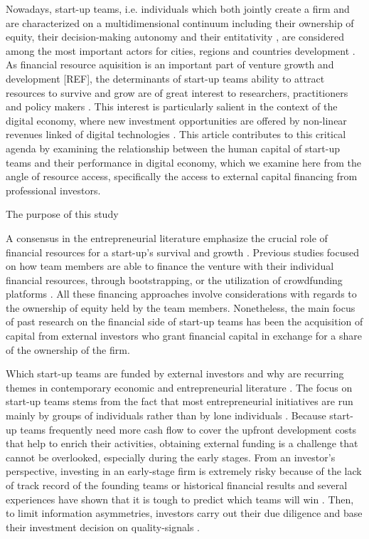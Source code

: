 \documentclass[12pt]{article}
\begin{document}
Nowadays, start-up teams, i.e. individuals which both jointly create a firm and are characterized on a multidimensional continuum including their ownership of equity, their decision-making autonomy and their entitativity \citep{kamm1990entrepreneurial, knight2020start}, are considered among the most important actors for cities, regions and countries development \citep{audretsch2001linking, autio2016entrepreneurship}. As financial resource aquisition is an important part of venture growth and development [REF], the determinants of start-up teams ability to attract resources to survive and grow are of great interest to researchers, practitioners and policy makers \citep{EUcommission2015digital}. This interest is particularly salient in the context of the digital economy, where new investment opportunities are offered by non-linear revenues linked of digital technologies \citep{nambisan2017digital, sahut2021age}. This article contributes to this critical agenda by examining the relationship between the human capital of start-up teams and their performance in digital economy, which we examine here from the angle of resource access, specifically the access to external capital financing from professional investors.

The purpose of this study

A consensus in the entrepreneurial literature emphasize the crucial role of financial resources for a start-up's survival and growth \citep{cooper1994initial}. Previous studies focused on how team members are able to finance the venture with their individual financial resources, through bootstrapping, or the utilization of crowdfunding platforms \citep{drover2017review, klein2020start}. All these financing approaches involve considerations with regards to the ownership of equity held by the team members. Nonetheless, the main focus of past research on the financial side of start-up teams has been the acquisition of capital from external investors who grant financial capital in exchange for a share of the ownership of the firm.

Which start-up teams are funded by external investors and why are recurring themes in contemporary economic and entrepreneurial literature \citep{baum2004picking, beckman2007early, bernstein2017attracting, franke2006you, franke2008venture, plummer2016better, kaplan2009should, shane2002network}. The focus on start-up teams stems from the fact that most entrepreneurial initiatives are run mainly by groups of individuals rather than by lone individuals \citep{klotz2014new}. Because start-up teams frequently need more cash flow to cover the upfront development costs that help to enrich their activities, obtaining external funding is a challenge that cannot be overlooked, especially during the early stages. From an investor's perspective, investing in an early-stage firm is extremely risky because of the lack of track record of the founding teams or historical financial results and several experiences have shown that it is tough to predict which teams will win \citep{ghassemiautomated, duhigg2016google}. Then, to limit information asymmetries, investors carry out their due diligence and base their investment decision on quality-signals \citep{spence1978job, ko2018signaling}.
\end{document}
